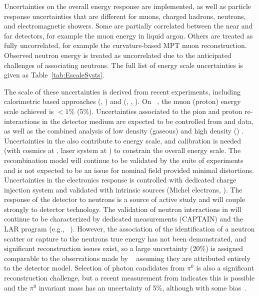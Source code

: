 Uncertainties on the overall energy response are implemented, as well as particle response uncertainties that are different for muons, charged hadrons, neutrons, and electromagnetic showers. Some are partially correlated between the near and far detectors, for example the muon energy in liquid argon. Others are treated as fully uncorrelated, for example the curvature-based MPT muon reconstruction. Observed neutron energy is treated as uncorrelated due to the anticipated challenges of associating neutrons. The full list of energy scale uncertainties is given as Table~\ref{tab:EscaleSysts}.

The scale of these uncertainties is derived from recent experiments, including calorimetric based approaches (, ) and  (, , ). On ~\cite{NOvA:2018gge}, the muon (proton) energy scale achieved is $<1$\% (5\%). Uncertainties associated to the pion and proton re-interactions in the detector medium are expected to be controlled from  and  data, as well as the combined analysis of low density (gaseous) and high density () . Uncertainties in the \efield also contribute to energy scale, and calibration is needed (with cosmics at , laser system at ) to constrain the overall energy scale. The recombination model will continue to be validated by the suite of  experiments and is not expected to be an issue for nominal field provided minimal \efield distortions. 
Uncertainties in the electronics response is controlled with dedicated charge injection system and validated with intrinsic sources (Michel electrons, ).
The response of the detector to neutrons is a source of active study and will couple strongly to detector technology. The validation of neutron interactions in  will continue to be characterized by dedicated measurements (CAPTAIN) and the LAR program (e.g., ~\cite{PhysRevD.99.012002}).  However, the association of the identification of a neutron scatter or capture to the neutrons true energy has not been demonstrated, and significant reconstruction issues exist, so a large uncertainty (20\%) is assigned comparable to the observations made by ~\cite{Elkins:2019vmy} assuming they are attributed entirely to the detector model. Selection of photon candidates from $\pi^0$ is also a significant reconstruction challenge, but a recent measurement from  indicates this is possible and the $\pi^0$ invariant mass has an uncertainty of 5\%, although with some bias~\cite{Adams:2018sgn}.

